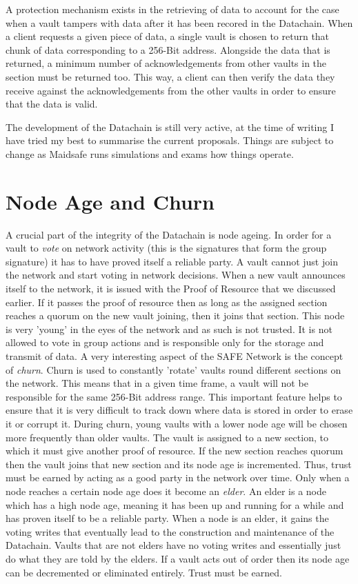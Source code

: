 \documentclass{l4proj}
\begin{document}
A protection mechanism exists in the retrieving of data to account for the case when a vault tampers with data after it has been recored in the Datachain. When a client requests a given piece of data, a single vault is chosen to return that chunk of data corresponding to a 256-Bit address. Alongside the data that is returned, a minimum number of acknowledgements from other vaults in the section must be returned too. This way, a client can then verify the data they receive against the acknowledgements from the other vaults in order to ensure that the data is valid.

The development of the Datachain is still very active, at the time of writing I have tried my best to summarise the current proposals. Things are subject to change as Maidsafe runs simulations and exams how things operate.

\section{Node Age and Churn}

A crucial part of the integrity of the Datachain is node ageing. In order for a vault to \textit{vote} on network activity (this is the signatures that form the group signature) it has to have proved itself a reliable party. A vault cannot just join the network and start voting in network decisions. When a new vault announces itself to the network, it is issued with the Proof of Resource that we discussed earlier. If it passes the proof of resource then as long as the assigned section reaches a quorum on the new vault joining, then it joins that section. This node is very 'young' in the eyes of the network and as such is not trusted. It is not allowed to vote in group actions and is responsible only for the storage and transmit of data. A very interesting aspect of the SAFE Network is the concept of \textit{churn}. Churn is used to constantly 'rotate' vaults round different sections on the network. This means that in a given time frame, a vault will not be responsible for the same 256-Bit address range. This important feature helps to ensure that it is very difficult to track down where data is stored in order to erase it or corrupt it. During churn, young vaults with a lower node age will be chosen more frequently than older vaults. The vault is assigned to a new section, to which it must give another proof of resource. If the new section reaches quorum then the vault joins that new section and its node age is incremented. Thus, trust must be earned by acting as a good party in the network over time. Only when a node reaches a certain node age does it become an \textit{elder}. An elder is a node which has a high node age, meaning it has been up and running for a while and has proven itself to be a reliable party. When a node is an elder, it gains the voting writes that eventually lead to the construction and maintenance of the Datachain. Vaults that are not elders have no voting writes and essentially just do what they are told by the elders. If a vault acts out of order then its node age can be decremented or eliminated entirely. Trust must be earned.
\end{document}
